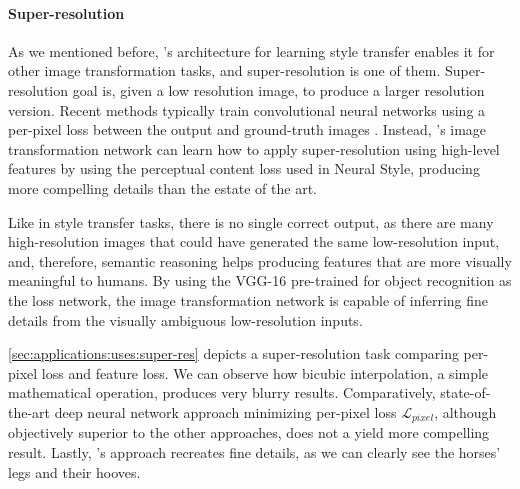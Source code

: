 \paragraph{Super-resolution}
As we mentioned before, \citeauthor{Johnson2016}'s architecture for learning style transfer enables it for other image transformation tasks, and super-resolution is one of them.
Super-resolution goal is, given a low resolution image, to produce a larger resolution version.
Recent methods typically train convolutional neural networks using a per-pixel loss between the output and ground-truth images \cite{Dong2016}.
Instead, \citeauthor{Johnson2016}'s image transformation network can learn how to apply super-resolution using high-level features by using the perceptual content loss used in Neural Style, producing more compelling details than the estate of the art.

Like in style transfer tasks, there is no single correct output, as there are many high-resolution images that could have generated the same low-resolution input, and, therefore, semantic reasoning helps producing features that are more visually meaningful to humans.
By using the VGG-16 pre-trained for object recognition as the loss network, the image transformation network is capable of inferring fine details from the visually ambiguous low-resolution inputs.

\autoref{sec:applications:uses:super-res} depicts a super-resolution task comparing per-pixel loss and feature loss.
We can observe how bicubic interpolation, a simple mathematical operation, produces very blurry results.
Comparatively, state-of-the-art deep neural network approach minimizing per-pixel loss $\mathcal{L}_{pixel}$, although objectively superior to the other approaches, does not a yield more compelling result.
Lastly, \citeauthor{Johnson2016}'s approach recreates fine details, as we can clearly see the horses' legs and their hooves.

